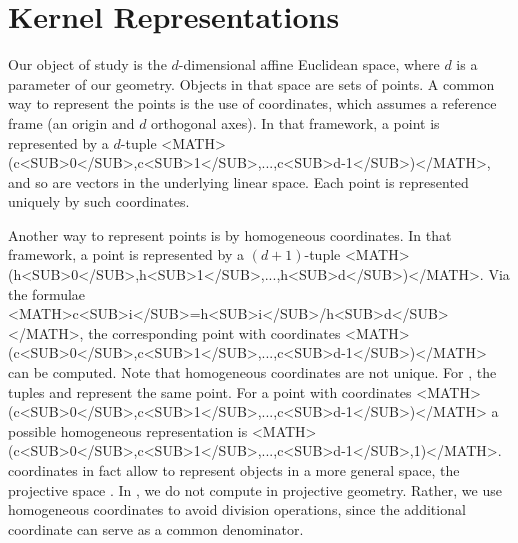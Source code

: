 \chapter{Kernel Representations}

Our object of study is the $d$-dimensional affine Euclidean space,
where $d$ is a parameter of our geometry.  Objects in that space are
sets of points. A common way to represent the points is the use of
 coordinates, which assumes a reference
frame (an origin and $d$ orthogonal axes).  In that framework, a point
is represented by a $d$-tuple
%
{<MATH>(c<SUB>0</SUB>,c<SUB>1</SUB>,...,c<SUB>d-1</SUB>)</MATH>},
and so are vectors in the underlying linear space. Each point is
represented uniquely by such 
coordinates.

Another way to represent points is by homogeneous coordinates. In that
framework, a point is represented by a $(d+1)$-tuple
%
{<MATH>(h<SUB>0</SUB>,h<SUB>1</SUB>,...,h<SUB>d</SUB>)</MATH>}.
Via the formulae
%
{<MATH>c<SUB>i</SUB>=h<SUB>i</SUB>/h<SUB>d</SUB></MATH>},
the corresponding point with  coordinates
%
{<MATH>(c<SUB>0</SUB>,c<SUB>1</SUB>,...,c<SUB>d-1</SUB>)</MATH>}
can be computed.  Note that homogeneous coordinates are not unique. 
For ,
the tuples 
and 
 represent the same point.
For a point with  coordinates 
%
{<MATH>(c<SUB>0</SUB>,c<SUB>1</SUB>,...,c<SUB>d-1</SUB>)</MATH>} a
possible homogeneous representation is
%
{<MATH>(c<SUB>0</SUB>,c<SUB>1</SUB>,...,c<SUB>d-1</SUB>,1)</MATH>}.
 coordinates in fact allow to represent 
objects in a more general space, the projective space
.
In \cgal, we do not compute in projective geometry. Rather, we use 
homogeneous coordinates to avoid division operations,
since the additional coordinate can serve as a common denominator.

